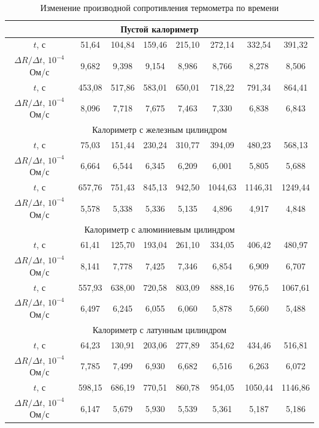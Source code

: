 \documentclass[a4paper,12pt]{article} %
\begin{document}
\begin{table}[]
    \centering
    \begin{tabular}{|c|c|c|c|c|c|c|c|}\hline
        \multicolumn{8}{|c|}{Пустой калориметр}\\ \hline
        $t$, с & 51,64 & 104,84 & 159,46 & 215,10 & 272,14 & 332,54 & 391,32 \\ \hline 
        $\Delta R/\Delta t$, $10^{-4}$ Ом/с & 9,682 & 9,398 & 9,154 & 8,986 & 8,766 & 8,278 & 8,506 \\ \hline 
        $t$, с & 453,08 & 517,86 & 583,01 & 650,01 & 718,22 & 791,34 & 864,41 \\ \hline 
        $\Delta R/\Delta t$, $10^{-4}$ Ом/с & 8,096 & 7,718 & 7,675 & 7,463 & 7,330 & 6,838 & 6,843 \\ \hline
        \multicolumn{8}{|c|}{Калориметр с железным цилиндром}\\ \hline
        $t$, с & 75,03 & 151,44 & 230,24 & 310,77 & 394,09 & 480,23 & 568,13 \\ \hline
        $\Delta R/\Delta t$, $10^{-4}$ Ом/с & 6,664 & 6,544 & 6,345 & 6,209 & 6,001 & 5,805 & 5,688 \\ \hline
        $t$, с & 657,76 & 751,43 & 845,13 & 942,50 & 1044,63 & 1146,31 & 1249,44 \\ \hline
        $\Delta R/\Delta t$, $10^{-4}$ Ом/с & 5,578 & 5,338 & 5,336 & 5,135 & 4,896 & 4,917 & 4,848 \\ \hline 
        \multicolumn{8}{|c|}{Калориметр с алюминиевым цилиндром}\\ \hline
        $t$, с & 61,41 & 125,70 & 193,04 & 261,10 & 334,05 & 406,42 & 480,97 \\ \hline
        $\Delta R/\Delta t$, $10^{-4}$ Ом/с & 8,141 & 7,778 & 7,425 & 7,346 & 6,854 & 6,909 & 6,707 \\ \hline
        $t$, с & 557,93 & 638,00 & 720,58 & 803,09 & 888,16 & 976,5 & 1067,61 \\ \hline
        $\Delta R/\Delta t$, $10^{-4}$ Ом/с & 6,497 & 6,245 & 6,055 & 6,060 & 5,878 & 5,660 & 5,488 \\ \hline
        \multicolumn{8}{|c|}{Калориметр с латунным цилиндром}\\ \hline
        $t$, с & 64,23 & 130,91 & 203,06 & 277,89 & 354,62 & 434,46 & 516,81\\ \hline
        $\Delta R/\Delta t$, $10^{-4}$ Ом/с & 7,785 & 7,499 & 6,930 & 6,682 & 6,516 & 6,263 & 6,072 \\ \hline
        $t$, с & 598,15 & 686,19 & 770,51 & 860,78 & 954,05 & 1050,44 & 1146,86\\ \hline
        $\Delta R/\Delta t$, $10^{-4}$ Ом/с & 6,147 & 5,679 & 5,930 & 5,539 & 5,361 & 5,187 & 5,186 \\ \hline
        \end{tabular}
    \caption{Изменение производной сопротивления термометра по времени}
    \label{tab:difs}
\end{table}
\end{document}
